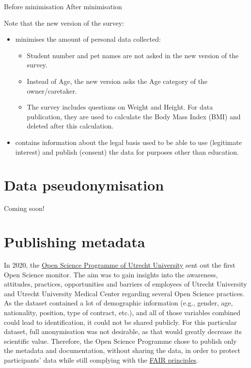 \documentclass[
]{book}
\providecommand{\tightlist}{%
  \setlength{\itemsep}{0pt}\setlength{\parskip}{0pt}}
\begin{document}
Before minimisation
After minimisation

Note that the new version of the survey:

\begin{itemize}
\tightlist
\item
  minimises the amount of personal data collected:

  \begin{itemize}
  \tightlist
  \item
    Student number and pet names are not asked in the new version of the survey.
  \item
    Instead of Age, the new version asks the Age category of the owner/caretaker.
  \item
    The survey includes questions on Weight and Height. For data publication,
    they are used to calculate the Body Mass Index (BMI) and deleted after this
    calculation.
  \end{itemize}
\item
  contains information about the legal basis used to be able to use (legitimate
  interest) and publish (consent) the data for purposes other than education.
\end{itemize}

\hypertarget{youth-pseudonymisation}{%
\chapter{Data pseudonymisation}\label{youth-pseudonymisation}}

Coming soon!

\hypertarget{open-science-questionnaire}{%
\chapter{Publishing metadata}\label{open-science-questionnaire}}

In 2020, the \href{https://www.uu.nl/en/research/open-science}{Open Science Programme of Utrecht University}
sent out the first
Open Science monitor. The aim was to gain insights into the awareness,
attitudes, practices, opportunities and barriers of employees of Utrecht
University and Utrecht University Medical Center regarding several Open
Science practices. As the dataset contained a lot of demographic information
(e.g., gender, age, nationality, position, type of contract, etc.), and all of
those variables combined could lead to identification, it could not be shared
publicly. For this particular dataset, full anonymisation was not desirable,
as that would greatly decrease its scientific value. Therefore, the Open Science
Programme chose to publish only the metadata and documentation, without sharing
the data, in order to protect participants' data while still complying with the
\href{https://www.uu.nl/en/research/research-data-management/guides/how-to-make-your-data-fair}{FAIR principles}.
\end{document}
